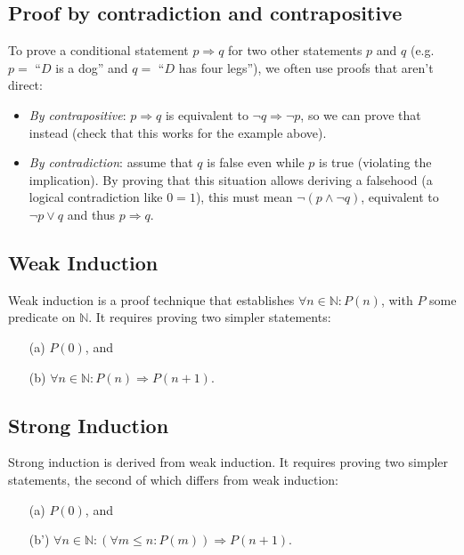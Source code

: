 \subsection*{Proof by contradiction and contrapositive}
To prove a conditional statement $p \Rightarrow q$ for two other statements $p$ and $q$ (e.g.\ $p =$ ``$D$ is a dog'' and $q =$ ``$D$ has four legs''), we often use proofs that aren't direct:
\begin{itemize}
\item \emph{By contrapositive}: $p \Rightarrow q$ is equivalent to $\neg q \Rightarrow \neg p$, so we can prove that instead (check that this works for the example above).
\item \emph{By contradiction}: assume that $q$ is false even while $p$ is true (violating the implication). By proving that this situation allows deriving a falsehood (a logical contradiction like $0 = 1$), this must mean $\neg (p \wedge \neg q)$, equivalent to $\neg p \vee q$ and thus $p \Rightarrow q$.
\end{itemize}

\subsection*{Weak Induction}

Weak induction is a proof technique that establishes $\forall n \in \mathbb{N}:
P(n)$, with $P$ some predicate on $\mathbb{N}$.
It requires proving two simpler statements:
\begin{itemize}
	\item[(a)] $P(0)$, and
	\item[(b)] $\forall n \in \mathbb{N}: P(n) \Rightarrow P(n+1)$.
\end{itemize}

\subsection*{Strong Induction}
Strong induction is derived from weak induction. It requires proving two simpler statements, the second of which differs from weak induction:
\begin{itemize}
	\item[(a)] $P(0)$, and
	\item[(b')] $\forall n \in \mathbb{N}: (\forall m \leq n: P(m)) \Rightarrow P(n+1)$.
\end{itemize}
